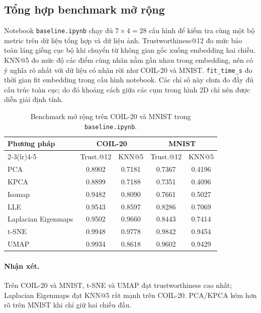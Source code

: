 \subsection{Tổng hợp benchmark mở rộng}
\label{sec:extended-benchmark}

Notebook \texttt{baseline.ipynb} chạy đủ $7\times4=28$ cấu hình để kiểm tra
cùng một bộ metric trên dữ liệu tổng hợp và dữ liệu ảnh. Trustworthiness@12 đo
mức bảo toàn láng giềng cục bộ khi chuyển từ không gian gốc xuống embedding hai
chiều. KNN@5 đo mức độ các điểm cùng nhãn nằm gần nhau trong embedding, nên có
ý nghĩa rõ nhất với dữ liệu có nhãn rời như COIL-20 và MNIST.
\texttt{fit\_time\_s} đo thời gian fit embedding trong cấu hình notebook. Các
chỉ số này chưa đo đầy đủ cấu trúc toàn cục; do đó khoảng cách giữa các cụm
trong hình 2D chỉ nên được diễn giải định tính.

\begin{table}[H]
  \centering
  \caption{Benchmark mở rộng trên COIL-20 và MNIST trong \texttt{baseline.ipynb}.}
  \label{tab:extended-benchmark-coil-mnist}
  \begin{tabular}{@{}lcccc@{}}
    \toprule
    \textbf{Phương pháp} & \multicolumn{2}{c}{\textbf{COIL-20}} & \multicolumn{2}{c}{\textbf{MNIST}} \\
    \cmidrule(lr){2-3}\cmidrule(lr){4-5}
    & Trust.@12 & KNN@5 & Trust.@12 & KNN@5 \\
    \midrule
    PCA & 0.8902 & 0.7181 & 0.7367 & 0.4196 \\
    KPCA & 0.8899 & 0.7188 & 0.7351 & 0.4096 \\
    Isomap & 0.9482 & 0.8090 & 0.7661 & 0.5027 \\
    LLE & 0.9543 & 0.8597 & 0.8286 & 0.7069 \\
    Laplacian Eigenmaps & 0.9502 & 0.9660 & 0.8443 & 0.7414 \\
    t-SNE & 0.9948 & 0.9778 & 0.9842 & 0.9454 \\
    UMAP & 0.9934 & 0.8618 & 0.9602 & 0.9429 \\
    \bottomrule
  \end{tabular}
\end{table}

\paragraph{Nhận xét.}
Trên COIL-20 và MNIST, t-SNE và UMAP đạt trustworthiness cao nhất; Laplacian
Eigenmaps đạt KNN@5 rất mạnh trên COIL-20. PCA/KPCA kém hơn rõ trên MNIST khi
chỉ giữ hai chiều đầu.


